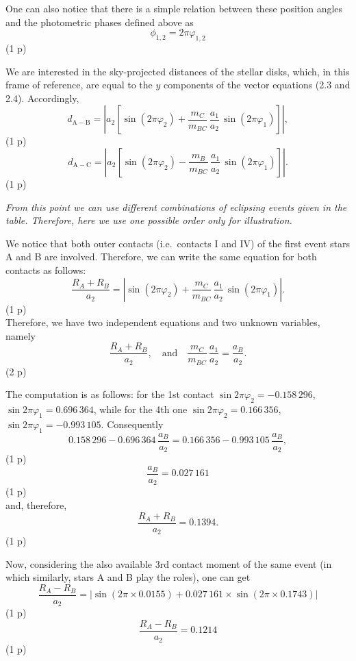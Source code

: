 \begin{description}
\begin{description}
    One can also notice that there is a simple relation between these
    position angles and the photometric phases defined above as
    \[ \phi_{1,2} = 2\pi\varphi_{1,2}
       \tag*{(2.7)} \]
    \hfill(1 p)

    We are interested in the sky-projected distances of the stellar disks,
    which, in this frame of reference, are equal to the $y$ components of
    the vector equations (2.3 and 2.4). Accordingly,
    \[ d_{\mathrm{A-B}} = \left| a_2 \left[ \sin(2\pi\varphi_2)
       + \frac{m_C}{m_{BC}}\,\frac{a_1}{a_2}\,\sin(2\pi\varphi_1)
       \right] \right|,
       \tag*{(2.8)} \]
    \hfill(1 p)
    \[ d_{\mathrm{A-C}} = \left| a_2 \left[ \sin(2\pi\varphi_2)
       - \frac{m_B}{m_{BC}}\,\frac{a_1}{a_2}\,\sin(2\pi\varphi_1)
       \right] \right|.
       \tag*{(2.9)} \]
    \hfill(1 p)

    \emph{From this point we can use different combinations of eclipsing
    events given in the table. Therefore, here we use one possible order
    only for illustration.}

    We notice that both outer contacts (i.e.\ contacts I and IV) of the
    first event stars A and B are involved. Therefore, we can write the same
    equation for both contacts as follows:
    \[ \frac{R_A + R_B}{a_2} = \left| \sin(2\pi\varphi_2)
       + \frac{m_C}{m_{BC}}\,\frac{a_1}{a_2}\,\sin(2\pi\varphi_1) \right|.
       \tag*{(2.10)} \]
    \hfill(1 p)\\
    Therefore, we have two independent equations and two unknown variables,
    namely
    \[ \frac{R_A + R_B}{a_2}, \quad\text{and}\quad
       \frac{m_C}{m_{BC}}\,\frac{a_1}{a_2} = \frac{a_B}{a_2}.
       \tag*{(2.11)} \]
    \hfill(2 p)

    The computation is as follows: for the 1st contact
    $\sin 2\pi\varphi_2 = -0.158\,296$,
    $\sin 2\pi\varphi_1 = 0.696\,364$, while for the 4th one
    $\sin 2\pi\varphi_2 = 0.166\,356$,
    $\sin 2\pi\varphi_1 = -0.993\,105$. Consequently
    \[ 0.158\,296 - 0.696\,364\,\frac{a_B}{a_2}
       = 0.166\,356 - 0.993\,105\,\frac{a_B}{a_2},
       \tag*{(2.12)} \]
    \hfill(1 p)
    \[ \frac{a_B}{a_2} = 0.027\,161
       \tag*{(2.13)} \]
    \hfill(1 p)\\
    and, therefore,
    \[ \frac{R_A + R_B}{a_2} = 0.1394.
       \tag*{(2.14)} \]
    \hfill(1 p)

    Now, considering the also available 3rd contact moment of the same event
    (in which similarly, stars A and B play the roles), one can get
    \[ \frac{R_A - R_B}{a_2}
       = \left| \sin(2\pi \times 0.0155)
       + 0.027\,161 \times \sin(2\pi \times 0.1743) \right|
       \tag*{(2.15)} \]
    \hfill(1 p)
    \[ \frac{R_A - R_B}{a_2} = 0.1214
       \tag*{(2.16)} \]
    \hfill(1 p)


\end{description}
\end{description}
